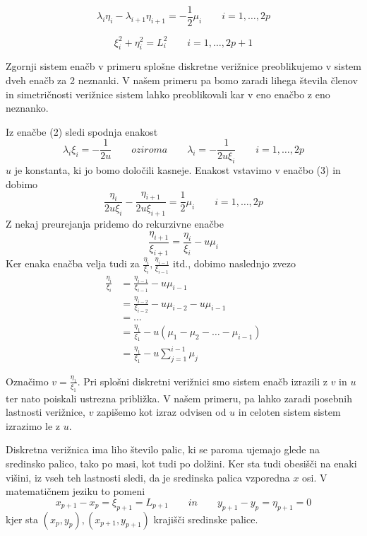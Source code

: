 \documentclass[A4paper, 11pt]{article}
\begin{document}
\begin{equation}
\lambda_i \eta_i - \lambda_{i+1} \eta_{i+1} = - \frac{1}{2} \mu_i \qquad i=1, \ldots, 2p 
\end{equation}

\begin{equation}
\xi_i ^2 + \eta_i ^2 = L_i ^2 \qquad i=1, \ldots, 2p+1 
\end{equation}

Zgornji sistem enačb v primeru splošne diskretne verižnice preoblikujemo v sistem dveh enačb za 2 neznanki. V našem primeru pa bomo zaradi lihega števila členov in simetričnosti verižnice sistem lahko preoblikovali kar v eno enačbo z eno neznanko. 

Iz enačbe (2) sledi spodnja enakost
\[ \lambda_i \xi_i = - \frac{1}{2u} \qquad oziroma \qquad \lambda_i = - \frac{1}{2u \xi_i} \qquad i=1, \ldots, 2p  \]
$u$ je konstanta, ki jo bomo določili kasneje. Enakost vstavimo v enačbo (3) in dobimo
\[ \frac{\eta_i}{2u \xi_i} - \frac{\eta_{i+1}}{2u \xi_{i+1}} = \frac{1}{2} \mu_i \qquad i=1, \ldots, 2p \]
Z nekaj preurejanja pridemo do rekurzivne enačbe
\[ \frac{\eta_{i+1}}{\xi_{i+1}} =  \frac{\eta_i}{\xi_i} - u \mu_i \]
Ker enaka enačba velja tudi za $\frac{\eta_i}{\xi_i}, \frac{\eta_{i-1}}{\xi_{i-1}}$ itd., dobimo naslednjo zvezo
\begin{equation}
\begin{split}
\frac{\eta_{i}}{\xi_{i}} & =  \frac{\eta_{i-1}}{\xi_{i-1}} - u \mu_{i-1}  \\
                                               & =  \frac{\eta_{i-2}}{\xi_{i-2}} - u \mu_{i-2} - u \mu_{i-1}  \\
                                               & = \ldots  \\
                                               & = \frac{\eta_1}{\xi_1} - u (\mu_1 - \mu_2 - \ldots - \mu_{i-1})  \\
                                               & = \frac{\eta_1}{\xi_1} - u \sum_{j=1}^{i-1} \mu_j
\end{split}
\end{equation}

Označimo $v = \frac{\eta_1}{\xi_1}$. Pri splošni diskretni verižnici smo sistem enačb izrazili z $v$ in $u$ ter nato poiskali ustrezna približka. V našem primeru, pa lahko zaradi posebnih lastnosti verižnice, $v$ zapišemo kot izraz odvisen od $u$ in celoten sistem sistem izrazimo le z $u$.

Diskretna verižnica ima liho število palic, ki se paroma ujemajo glede na sredinsko palico, tako po masi, kot tudi po dolžini. Ker sta tudi obesišči na enaki višini, iz vseh teh lastnosti sledi, da je sredinska palica vzporedna $x$ osi. V matematičnem jeziku to pomeni
\begin{equation}
x_{p+1} - x_p = \xi_{p+1} = L_{p+1} \qquad in \qquad y_{p+1} - y_p = \eta_{p+1} = 0
\end{equation}
kjer sta $(x_p,y_p), (x_{p+1}, y_{p+1})$ krajišči sredinske palice.
\end{document}
